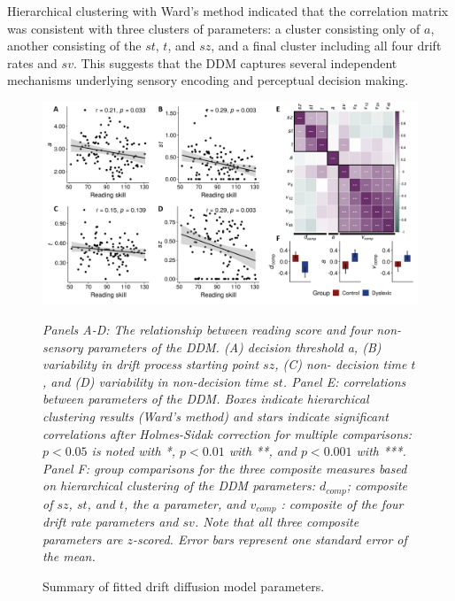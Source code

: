 \documentclass[../uwthesis.tex]{subfiles}
\begin{document}
Hierarchical clustering with Ward’s method\cite{Ward1963HierarchicalFunction} indicated that the correlation matrix was consistent with three clusters of parameters: a cluster consisting only of $a$, another consisting of
the $st$, $t$, and $sz$, and a final cluster including all four drift rates and $sv$. This suggests that the
DDM captures several independent mechanisms underlying sensory encoding and perceptual decision making.

\begin{figure}
    \centering
    \caption{Summary of fitted drift diffusion model parameters.}
    \label{fig:p3_fig4}
    \includegraphics[width=18cm]{images/paper_3/4_decision_parameters_modified.png}
    \item \textit{Panels A-D: The relationship between reading score and four non-sensory parameters
of the DDM. (A) decision threshold a, (B) variability in drift process starting point $sz$, (C) non-
decision time $t$, and (D) variability in non-decision time $st$. Panel E: correlations between
parameters of the DDM. Boxes indicate hierarchical clustering results (Ward’s method) and stars
indicate significant correlations after Holmes-Sidak correction for multiple comparisons: $p < 0.05$ is noted with *, $p < 0.01$ with **, and $p < 0.001$ with ***. Panel F: group comparisons for the
three composite measures based on hierarchical clustering of the DDM parameters: $d_{comp}$;
composite of $sz$, $st$, and $t$, the $a$ parameter, and $v_{comp}$ : composite of the four drift rate parameters
and $sv$. Note that all three composite parameters are $z$-scored. Error bars represent one standard
error of the mean.}

\end{figure}
\end{document}
